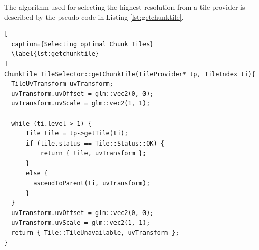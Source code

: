 The algorithm used for selecting the highest resolution  from a tile provider is described by the pseudo code in Listing \ref{lst:getchunktile}.

\begin{lstlisting}[
  caption={Selecting optimal Chunk Tiles} 
  \label{lst:getchunktile}
]
ChunkTile TileSelector::getChunkTile(TileProvider* tp, TileIndex ti){
  TileUvTransform uvTransform;
  uvTransform.uvOffset = glm::vec2(0, 0);
  uvTransform.uvScale = glm::vec2(1, 1);

  while (ti.level > 1) {
      Tile tile = tp->getTile(ti);
      if (tile.status == Tile::Status::OK) {
          return { tile, uvTransform };
      }
      else {
        ascendToParent(ti, uvTransform);
      }
  }
  uvTransform.uvOffset = glm::vec2(0, 0);
  uvTransform.uvScale = glm::vec2(1, 1);
  return { Tile::TileUnavailable, uvTransform };
}
\end{lstlisting}


